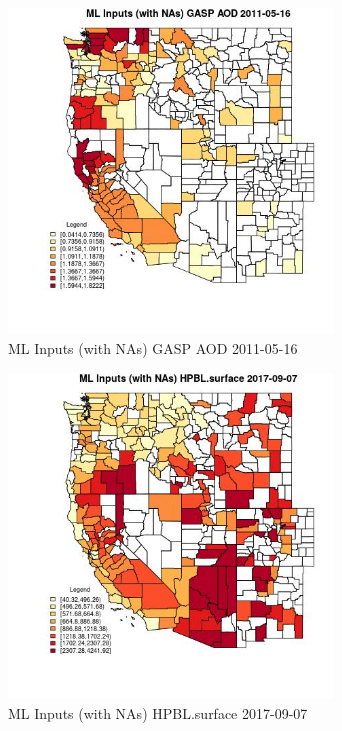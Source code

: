 \begin{figure} 
\centering  
\includegraphics[width=0.77\textwidth]{Code_Outputs/Report_ML_input_PM25_Step4_part_e_de_duplicated_aves_compiled_2019-05-20wNAs_CountyGASP_AODMean2011-05-16.jpg} 
\caption{\label{fig:Report_ML_input_PM25_Step4_part_e_de_duplicated_aves_compiled_2019-05-20wNAsCountyGASP_AODMean2011-05-16}ML Inputs (with NAs) GASP AOD 2011-05-16} 
\end{figure} 
 

\begin{figure} 
\centering  
\includegraphics[width=0.77\textwidth]{Code_Outputs/Report_ML_input_PM25_Step4_part_e_de_duplicated_aves_compiled_2019-05-20wNAs_CountyHPBLsurfaceMean2017-09-07.jpg} 
\caption{\label{fig:Report_ML_input_PM25_Step4_part_e_de_duplicated_aves_compiled_2019-05-20wNAsCountyHPBLsurfaceMean2017-09-07}ML Inputs (with NAs) HPBL.surface 2017-09-07} 
\end{figure} 
 

